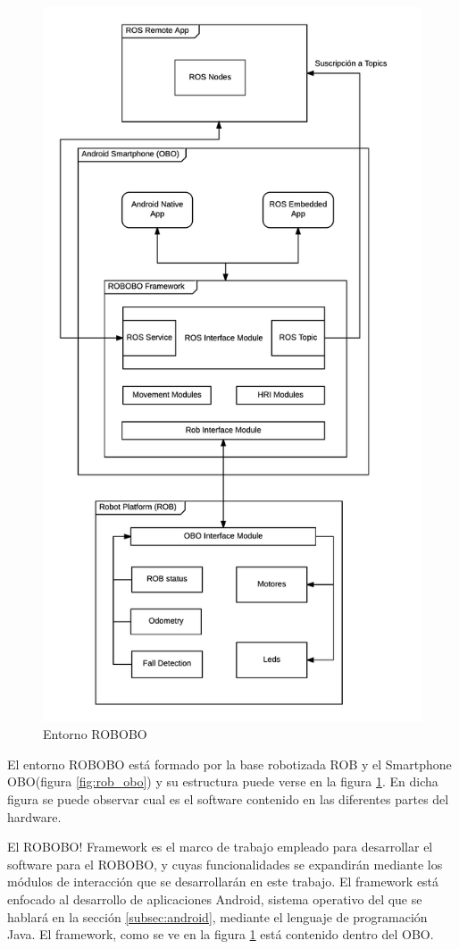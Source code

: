 \begin{figure}
	\centering
	\includegraphics[width=0.7\linewidth]{imagenes/robobo_framework_2.png}
	\caption{Entorno ROBOBO}
	\label{fig:robobo_framework_estructure}
\end{figure}

El entorno ROBOBO está formado por la base robotizada ROB y el Smartphone OBO(figura \ref{fig:rob_obo}) y su estructura puede verse en la figura \ref{fig:robobo_framework_estructure}. En dicha figura se puede observar cual es el software contenido en las diferentes partes del hardware.

El ROBOBO! Framework es el marco de trabajo empleado para desarrollar el software para el ROBOBO, y cuyas funcionalidades se expandirán mediante los módulos de interacción que se desarrollarán en este trabajo. El framework está enfocado al desarrollo de aplicaciones Android, sistema operativo del que se hablará en la sección \ref{subsec:android}, mediante el lenguaje de programación Java. El framework, como se ve en la figura \ref{fig:robobo_framework_estructure} está contenido dentro del OBO.
 

